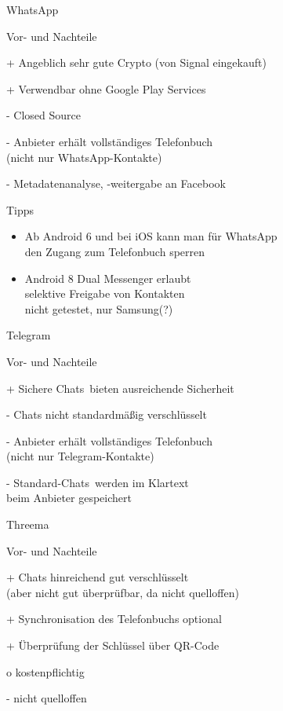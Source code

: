 
\begin{frame}{WhatsApp}
\begin{blex}{Vor- und Nachteile}
\item[+] Angeblich sehr gute Crypto (von Signal eingekauft)
\item[+] Verwendbar ohne Google Play Services
\item[-] Closed Source
\item[-] Anbieter erhält vollständiges Telefonbuch\\
  (nicht nur WhatsApp-Kontakte)
\item[-] Metadatenanalyse, -weitergabe an Facebook
\end{blex}
\begin{block}{Tipps}
  \begin{itemize}
    \item Ab Android 6 und bei iOS kann man für WhatsApp\\den Zugang zum Telefonbuch sperren
    \item Android 8 Dual Messenger erlaubt\\selektive Freigabe von Kontakten\\
      \scriptsize nicht getestet, nur Samsung(?) 
  \end{itemize}
\end{block}
\end{frame}

\begin{frame}{Telegram}
\begin{blex}{Vor- und Nachteile}
\item[+] \glqq Sichere Chats\grqq\ bieten ausreichende Sicherheit
\item[-] Chats nicht standardmäßig verschlüsselt
\item[-] Anbieter erhält vollständiges Telefonbuch\\ (nicht nur Telegram-Kontakte)
\item[-] \glqq Standard-Chats\grqq\ werden im Klartext\\beim Anbieter gespeichert
\end{blex}
\end{frame}

\begin{frame}{Threema}
\begin{blex}{Vor- und Nachteile}
\item[+] Chats hinreichend gut verschlüsselt\\(aber nicht gut überprüfbar, da nicht quelloffen)
\item[+] Synchronisation des Telefonbuchs optional
\item[+] Überprüfung der Schlüssel über QR-Code
\item[o] kostenpflichtig
\item[-] nicht quelloffen
\end{blex}
\end{frame}

